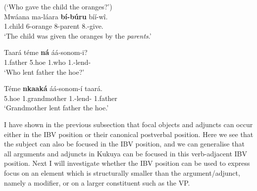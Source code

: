 \documentclass[output=paper,colorlinks,citecolor=brown,
]{langscibook}
\begin{document}
\begin{exe}
\ex
\label{41}
 (`Who gave the child the oranges?') \\
\gll
Mwáana ma-láara \textbf{bí-búru} bíí-wî.\\
1.child 6-orange 8-parent 8\Sm{}.\Pst{}-give.\Pst{}\\
\trans ‘The child was given the oranges by the \textit{parents}.’

\end{exe}
\begin{exe}
    \ex \label{42}
    \begin{xlist}
\ex
\label{42a}
\gll
Taará téme \textbf{ná} áá-sonom-i?\\
1.father 5.hoe 1.who 1\Sm{}.\Pst{}-lend-\Pst{}\\
\trans ‘Who lent father the hoe?’

\ex
\label{42b}
\gll
Téme \textbf{nkaaká} áá-sonom-í taará.\\
5.hoe 1.grandmother 1\Sm{}.\Pst{}-lend-\Pst{} 1.father\\
\trans ‘Grandmother lent father the hoe.’

    \end{xlist}
\end{exe}
 I have shown in the previous subsection that focal objects and adjuncts can occur either in the IBV position or their canonical postverbal position. Here we see that the subject can also be focused in the IBV position, and we can generalise that all arguments and adjuncts in Kukuya can be focused in this verb-adjacent IBV position. Next I will investigate whether the IBV position can be used to express focus on an element which is structurally smaller than the argument/adjunct, namely a modifier, or on a larger constituent such as the VP.
\end{document}
